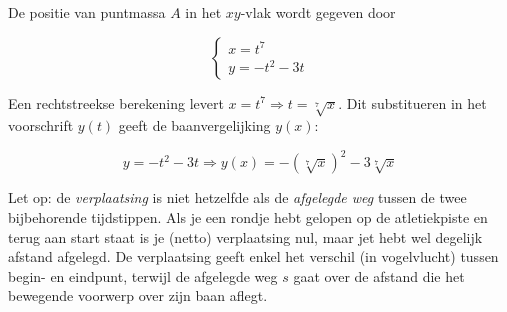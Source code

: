 \documentclass{ximera}
\begin{document}
\begin{example}
De positie van puntmassa \(A\) in het \(xy\)-vlak wordt gegeven door 

\[
\left\{
\begin{array}{l}
	x = t^7 \\ 
	y = -t^2 - 3t
\end{array}
\right.
\]


Een rechtstreekse berekening levert \( x = t^7 \Rightarrow t = \sqrt[7]{x} \). 
Dit substitueren in het voorschrift \(y(t)\) geeft de baanvergelijking \(y(x)\): 

\[
y = -t^2 - 3t \Rightarrow y(x) = -(\sqrt[7]{x})^2 - 3\sqrt[7]{x}
\]


\end{example}


Let op: de \textit{verplaatsing} is niet hetzelfde als de \emph{afgelegde weg} tussen de twee bijbehorende tijdstippen. 
Als je een rondje hebt gelopen op de atletiekpiste en terug aan start staat is je (netto) verplaatsing nul, maar jet hebt wel degelijk afstand afgelegd.
De verplaatsing geeft enkel het verschil (in vogelvlucht) tussen begin- en eindpunt, terwijl de afgelegde weg \(s\) gaat over de afstand die het bewegende voorwerp over zijn baan aflegt. 

\begin{image}[0.5\textwidth]

\end{image}


\end{document}
